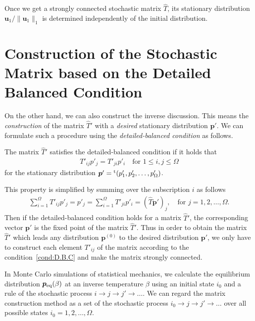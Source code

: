 Once we get a strongly connected stochastic matrix $\hat{T}$, its stationary distribution $\bm{u}_{1}/\|\bm{u}_{1}\|_{1}$ is determined independently of the initial distribution.

\section{Construction of the Stochastic Matrix based on the Detailed Balanced Condition}

On the other hand, we can also construct the inverse discussion. This means the \textit{construction} of the matrix $\hat{T}'$ with a \textit{desired} stationary distribution $\bm{p}'$. We can formulate such a procedure using the \textit{detailed-balanced condition} as follows.
\begin{definition}
	The matrix $\hat{T}'$ satisfies the detailed-balanced condition if it holds that
	\begin{align}
	T'_{ij}p'_{j} = T'_{ji}p'_{i}\quad\text{for $1\leq i,j\leq \Omega$}\label{cond:D.B.C}
	\end{align}
	for the stationary distribution $\bm{p}'={}^{\rm t}(p'_{1},p'_{2},\dots,p'_{\Omega})$.
\end{definition}
This property is simplified by summing over the subscription $i$ as follows
\begin{align}
\sum_{i=1}^{\Omega}T'_{ij}p'_{j} = p'_{j} = \sum_{i=1}^{\Omega}T'_{ji}p'_{i} = \left(\hat{T}\bm{p}'\right)_{j},\quad\text{for $j=1,2,\dots,\Omega$}.
\end{align}
Then if the detailed-balanced condition holds for a matrix $\hat{T}'$, the corresponding vector $\bm{p}'$ is the fixed point of the matrix $\hat{T}'$. Thus in order to obtain the matrix $\hat{T}'$ which leads any distribution $\bm{p}^{(0)}$ to the desired distribution $\bm{p}'$, we only have to construct each element $T'_{ij}$ of the matrix according to the condition~\eqref{cond:D.B.C} and make the matrix strongly connected.

In Monte Carlo simulations of statistical mechanics, we calculate the equilibrium distribution $\bm{p}_{\rm eq}(\beta)$ at an inverse temperature $\beta$ using an initial state $i_{0}$ and a rule of the stochastic process $i\to j\to j'\to\dots$. We can regard the matrix construction method as a set of the stochastic process $i_{0}\to j\to j'\to\dots$ over all possible states $i_{0}=1,2,\dots,\Omega$.

